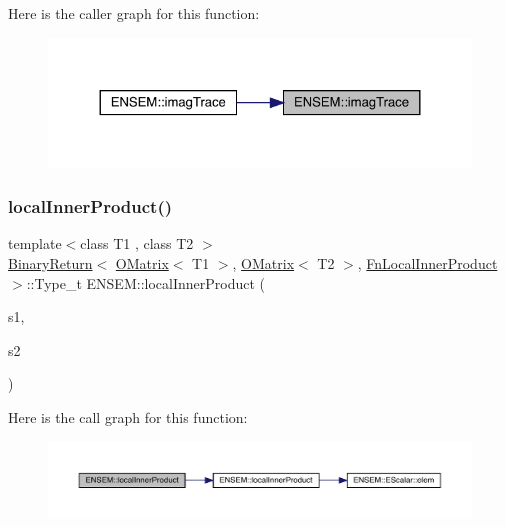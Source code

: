 Here is the caller graph for this function\+:\nopagebreak
\begin{figure}[H]
\begin{center}
\leavevmode
\includegraphics[width=324pt]{d8/d55/group__obsmatrix_ga3c2758e95f41075ca3a027c6651a66aa_icgraph}
\end{center}
\end{figure}
\mbox{\label{group__obsmatrix_ga53af10b5c51df2876f7569d4691cbd0d}} 
\subsubsection{\texorpdfstring{localInnerProduct()}{localInnerProduct()}\hspace{0.1cm}{\footnotesize\ttfamily [1/3]}}
{\footnotesize\ttfamily template$<$class T1 , class T2 $>$ \\
\mbox{\hyperlink{structENSEM_1_1BinaryReturn}{Binary\+Return}}$<$ \mbox{\hyperlink{classENSEM_1_1OMatrix}{O\+Matrix}}$<$ T1 $>$, \mbox{\hyperlink{classENSEM_1_1OMatrix}{O\+Matrix}}$<$ T2 $>$, \mbox{\hyperlink{structENSEM_1_1FnLocalInnerProduct}{Fn\+Local\+Inner\+Product}} $>$\+::Type\+\_\+t E\+N\+S\+E\+M\+::local\+Inner\+Product (\begin{DoxyParamCaption}\item[{const \mbox{\hyperlink{classENSEM_1_1OMatrix}{O\+Matrix}}$<$ T1 $>$ \&}]{s1,  }\item[{const \mbox{\hyperlink{classENSEM_1_1OMatrix}{O\+Matrix}}$<$ T2 $>$ \&}]{s2 }\end{DoxyParamCaption})\hspace{0.3cm}{\ttfamily [inline]}}

Here is the call graph for this function\+:\nopagebreak
\begin{figure}[H]
\begin{center}
\leavevmode
\includegraphics[width=350pt]{d8/d55/group__obsmatrix_ga53af10b5c51df2876f7569d4691cbd0d_cgraph}
\end{center}
\end{figure}
\mbox{\label{group__obsmatrix_ga23c94fe0afdadaedf50d233d675f0009}} 
